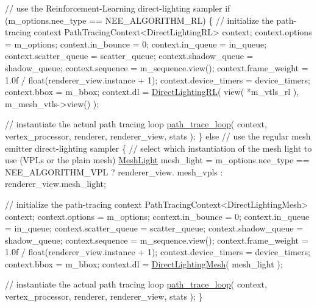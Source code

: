 \begin{DoxyCodeInclude}
        \textcolor{comment}{// use the Reinforcement-Learning direct-lighting sampler}
        \textcolor{keywordflow}{if} (m\_options.nee\_type == NEE\_ALGORITHM\_RL)
        \{
            \textcolor{comment}{// initialize the path-tracing context}
            PathTracingContext<DirectLightingRL> context;
            context.options         = m\_options;
            context.in\_bounce       = 0;
            context.in\_queue        = in\_queue;
            context.scatter\_queue   = scatter\_queue;
            context.shadow\_queue    = shadow\_queue;
            context.sequence        = m\_sequence.view();
            context.frame\_weight    = 1.0f / float(renderer\_view.instance + 1);
            context.device\_timers   = device\_timers;
            context.bbox            = m\_bbox;
            context.dl              = \hyperlink{struct_direct_lighting_r_l}{DirectLightingRL}(
                view( *m\_vtls\_rl ),
                m\_mesh\_vtls->view() );

            \textcolor{comment}{// instantiate the actual path tracing loop}
            \hyperlink{group___p_t_lib_gadbd6e824e2ecdd07fae235bddebcd1d8}{path\_trace\_loop}( context, vertex\_processor, renderer, renderer\_view, stats );
        \}
        \textcolor{keywordflow}{else} \textcolor{comment}{// use the regular mesh emitter direct-lighting sampler}
        \{
            \textcolor{comment}{// select which instantiation of the mesh light to use (VPLs or the plain mesh)}
            \hyperlink{struct_mesh_light}{MeshLight} mesh\_light = m\_options.nee\_type == NEE\_ALGORITHM\_VPL ? renderer\_view.
      mesh\_vpls : renderer\_view.mesh\_light;

            \textcolor{comment}{// initialize the path-tracing context}
            PathTracingContext<DirectLightingMesh> context;
            context.options         = m\_options;
            context.in\_bounce       = 0;
            context.in\_queue        = in\_queue;
            context.scatter\_queue   = scatter\_queue;
            context.shadow\_queue    = shadow\_queue;
            context.sequence        = m\_sequence.view();
            context.frame\_weight    = 1.0f / float(renderer\_view.instance + 1);
            context.device\_timers   = device\_timers;
            context.bbox            = m\_bbox;
            context.dl              = \hyperlink{struct_direct_lighting_mesh}{DirectLightingMesh}( mesh\_light );

            \textcolor{comment}{// instantiate the actual path tracing loop}
            \hyperlink{group___p_t_lib_gadbd6e824e2ecdd07fae235bddebcd1d8}{path\_trace\_loop}( context, vertex\_processor, renderer, renderer\_view, stats );
        \}
\end{DoxyCodeInclude}
